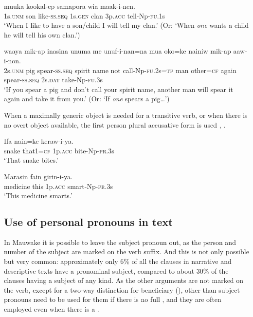 \ea%
\label{ex:3:x621}
\gll {} muuka kookal-ep  samapora wia maak-i-nen.\\
1s.\textsc{unm} son like-\textsc{ss}.\textsc{seq} 1s.\textsc{gen} clan 3p.\textsc{acc} tell-Np-\textsc{fu}.1s\\
\glt`When I like to have a son/child I will tell my clan.' (Or: `When \textit{one} wants a child he will tell his own clan.')
\z

\ea%
\label{ex:3:x622}
\gll {} waaya mik-ap inasina unuma me unuf-i-nan=na mua oko=ke nainiw mik-ap  aaw-i-non.\\
2s.\textsc{unm} pig spear-\textsc{ss}.\textsc{seq} spirit name not call-Np-\textsc{fu}.2s=\textsc{tp} man other=\textsc{cf} again spear-\textsc{ss}.\textsc{seq} 2s.\textsc{dat} take-Np-\textsc{fu}.3s\\
\glt`If you spear a pig and don't call your spirit name, another man will spear it again and take it from you.' (Or: `If \textit{one} spears a pig{\dots}')
\z

When a maximally generic object is needed for a transitive verb, or when there is no overt object available, the first person plural accusative form is used , . 

\ea%
\label{ex:3:x623}
\gll Ifa nain=ke  keraw-i-ya. \\
snake that1=\textsc{cf} 1p.\textsc{acc} bite-Np-\textsc{pr}.3s\\
\glt`That snake bites.'
\z

\ea%
\label{ex:3:x624}
\gll Marasin fain  girin-i-ya. \\
medicine this 1p.\textsc{acc} smart-Np-\textsc{pr}.3s\\
\glt`This medicine smarts.'
\z

\subsection{Use of personal pronouns in text}\label{sec:3.5.11}
{}
In Mauwake it is possible to leave the subject pronoun out, as the person and number of the subject are marked on the verb suffix. And this is not only possible but very common: approximately only 6\% of all the clauses in narrative and descriptive texts have a pronominal subject, compared to about 30\% of the clauses having a subject  of any kind. As the other arguments are not marked on the verb, except for a two-way distinction for beneficiary (), other than subject pronouns need to be used for them if there is no full , and they are often employed even when there is a .
%
%

